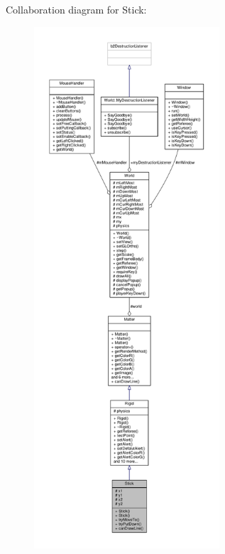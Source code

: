 Collaboration diagram for Stick\+:\nopagebreak
\begin{figure}[H]
\begin{center}
\leavevmode
\includegraphics[height=550pt]{classStick__coll__graph}
\end{center}
\end{figure}
